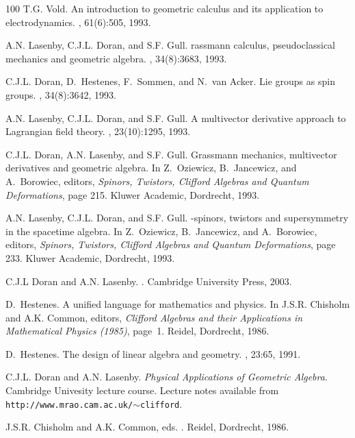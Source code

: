 \documentclass[a4paper]{article}
\numberwithin{equation}{section}
\begin{document}
\begin{thebibliography}{100}
T.G. Vold.
\newblock An introduction to geometric calculus and its application to
  electrodynamics.
, 61(6):505, 1993.

A.N. Lasenby, C.J.L. Doran, and S.F. Gull.
rassmann calculus, pseudoclassical mechanics and geometric
  algebra.
, 34(8):3683, 1993.

C.J.L. Doran, D.~Hestenes, F.~Sommen, and N.~van Acker.
\newblock Lie groups as spin groups.
, 34(8):3642, 1993.

A.N. Lasenby, C.J.L. Doran, and S.F. Gull.
\newblock A multivector derivative approach to {L}agrangian field theory.
, 23(10):1295, 1993.

C.J.L. Doran, A.N. Lasenby, and S.F. Gull.
\newblock Grassmann mechanics, multivector derivatives and geometric algebra.
\newblock In Z.~Oziewicz, B.~Jancewicz, and A.~Borowiec, editors, {\em Spinors,
  Twistors, {C}lifford Algebras and Quantum Deformations}, page 215. Kluwer
  Academic, Dordrecht, 1993.

A.N. Lasenby, C.J.L. Doran, and S.F. Gull.
-spinors, twistors and supersymmetry in the spacetime algebra.
\newblock In Z.~Oziewicz, B.~Jancewicz, and A.~Borowiec, editors, {\em Spinors,
  Twistors, {C}lifford Algebras and Quantum Deformations}, page 233. Kluwer
  Academic, Dordrecht, 1993.

C.J.L Doran and A.N. Lasenby.
.
\newblock Cambridge University Press, 2003.

D.~Hestenes.
\newblock A unified language for mathematics and physics.
\newblock In J.S.R. Chisholm and A.K. Common, editors, {\em {C}lifford Algebras
  and their Applications in Mathematical Physics (1985)}, page~1. Reidel,
  Dordrecht, 1986.

D.~Hestenes.
\newblock The design of linear algebra and geometry.
, 23:65, 1991.

C.J.L. Doran and A.N. Lasenby.
\newblock \textit{Physical {A}pplications of {G}eometric {A}lgebra}.
\newblock Cambridge Univesity lecture course. Lecture notes available from
  \texttt{http://www.mrao.cam.ac.uk/$\sim$clifford}.

{J.S.R. Chisholm and A.K. Common, eds.}
.
\newblock Reidel, Dordrecht, 1986.


\end{thebibliography}
\end{document}
